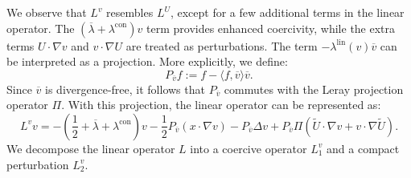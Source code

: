 \documentclass[11pt,a4paper]{article}
\numberwithin{equation}{section}
\newcommand{\assign}{:=}
\newcommand{\cdummy}{\cdot}
\begin{document}
We observe that $L^v$ resembles $L^U$,
except for a few additional terms in the linear operator. The
$(\overline{\lambda} + \lambda^\text{con}) v$ term provides enhanced coercivity, while the
extra terms $U \cdot \nabla v$ and $v \cdot \nabla U$ are treated as
perturbations.
The term $- \lambda^\text{lin} (v) \overline{v}$ can be interpreted as a projection.
More explicitly, we define:
\[ P_{\overline{v}} f \assign f - \langle f, \overline{v} \rangle \overline{v} . \]
Since $\overline{v}$ is divergence-free, it follows that $P_{\overline{v}}$
commutes with the Leray projection operator $\Pi$. With this projection, the
linear operator can be represented as:
\begin{equation*}\label{lin op v}
     L^v v = - ( \frac{1}{2} + \overline{\lambda} + \lambda^\text{con} ) v -
   \frac{1}{2} P_{\overline{v}}  (x \cdummy \nabla v) - P_{\overline{v}}\Delta v +
   P_{\overline{v}} \Pi (\widetilde{U} \cdot \nabla v + v \cdot \nabla \widetilde{U})
    .
\end{equation*}  We
decompose the linear operator $L$ into a coercive operator $L_1^v$
and a compact perturbation $L_2^v$.
\end{document}
